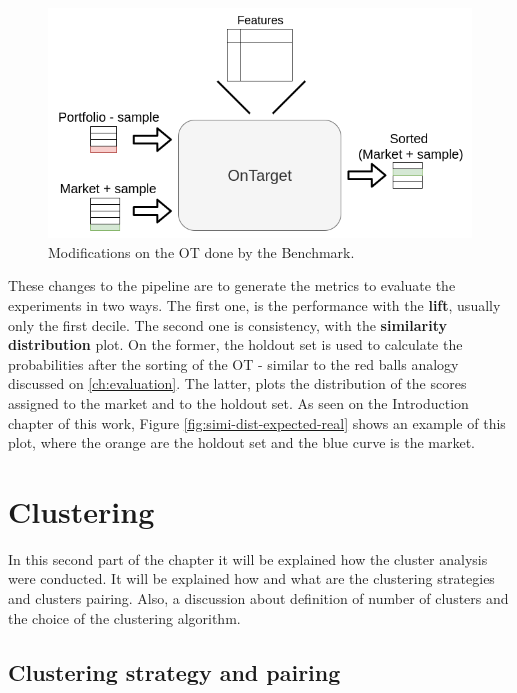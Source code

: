 \begin{figure}[h]
   \centering
   \includegraphics[width=\linewidth]{fig/ch3-ot-benchmark-blocks.png}
   \caption{Modifications on the OT done by the Benchmark.}
   \label{fig:ot-benchmark-blocks}
\end{figure}

These changes to the pipeline are to generate the metrics to evaluate the experiments in two ways. The first one, is the performance with the \textbf{lift}, usually only the first decile. The second one is consistency, with the \textbf{similarity distribution} plot. On the former, the holdout set is used to calculate the probabilities after the sorting of the OT - similar to the red balls analogy discussed on \ref{ch:evaluation}. The latter, plots the distribution of the scores assigned to the market and to the holdout set. As seen on the Introduction chapter of this work, Figure \ref{fig:simi-dist-expected-real} shows an example of this plot, where the orange are the holdout set and the blue curve is the market.

\section{Clustering}

In this second part of the chapter it will be explained how the cluster analysis were conducted. It will be explained how and what are the clustering strategies and clusters pairing. Also, a discussion about definition of number of clusters and the choice of the clustering algorithm.

\subsection{Clustering strategy and pairing}

\newcommand{\nameClusterStrategyA}{ToP}
\newcommand{\nameClusterStrategyB}{ToA}
\newcommand{\nameClusterPairingA}{OvO}
\newcommand{\nameClusterPairingB}{OvA}


